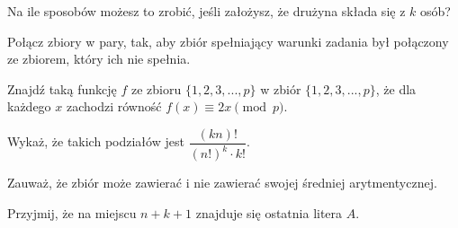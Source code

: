 
\begin{hints_list}
	\item Na ile sposobów możesz to zrobić, jeśli założysz, że drużyna składa się z $k$ osób?
	\item Połącz zbiory w pary, tak, aby zbiór spełniający warunki zadania był połączony ze zbiorem, który ich nie spełnia.
	\item *
	\item Znajdź taką funkcję $f$ ze zbioru $\{1, 2, 3,..., p\}$ w zbiór $\{1, 2, 3,..., p\}$, że dla każdego $x$ zachodzi równość $f(x) \equiv 2x \pmod{p}$.
	\item Wykaż, że takich podziałów jest $\dfrac{(kn)!}{(n!)^k \cdot k!}$.
	\item Zauważ, że zbiór może zawierać i nie zawierać swojej średniej arytmentycznej.
	\item Przyjmij, że na miejscu $n + k + 1$ znajduje się ostatnia litera $A$.
\end{hints_list}